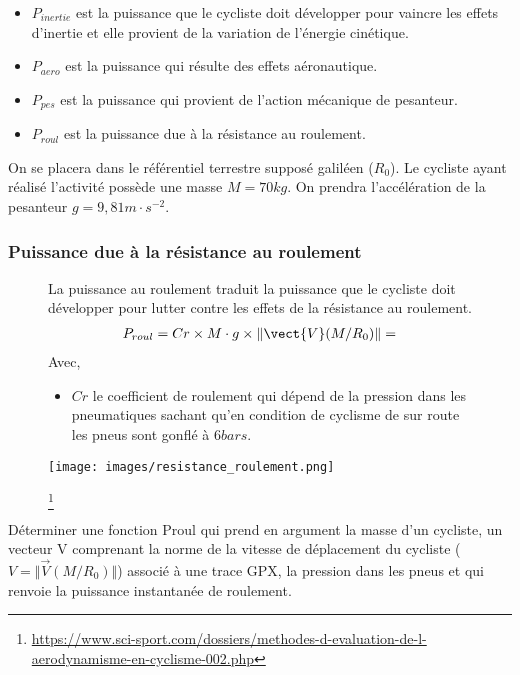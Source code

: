 \begin{itemize}
\item $P_{inertie}$ est la puissance que le cycliste doit développer pour vaincre les effets d'inertie et elle provient de la variation de l'énergie cinétique. 
\item $P_{aero}$ est la puissance qui résulte des effets aéronautique.
\item $P_{pes}$ est la puissance qui provient de l'action mécanique de pesanteur.
\item $P_{roul}$ est la puissance due à la résistance au roulement.
\end{itemize}

On se placera dans le référentiel terrestre supposé galiléen ($R_0$). Le cycliste ayant réalisé l'activité possède une masse $M=70kg$. On prendra l'accélération de la pesanteur $g=9,81m\cdot s^{-2}$.

\subsubsection{Puissance due à la résistance au roulement}

\begin{figure}[!htb]
\begin{minipage}{0.5\textwidth}
La puissance au roulement traduit la puissance que le cycliste doit développer pour lutter contre les effets de la résistance au roulement.
\begin{align*}
P_{roul}=Cr\times M\cdot g\times \Vert \vect{V}(M/R_0)\Vert=
\end{align*}
Avec,
\begin{itemize}
\item $Cr$ le coefficient de roulement qui dépend de la pression dans les pneumatiques sachant qu'en condition de cyclisme de sur route les pneus sont gonflé à $6bars$.
\end{itemize}
\end{minipage}
\begin{minipage}{0.5\textwidth}
\begin{center}
\texttt{[image: images/resistance\_roulement.png]}
\caption{\label{res_roul}}
\footnote{\url{https://www.sci-sport.com/dossiers/methodes-d-evaluation-de-l-aerodynamisme-en-cyclisme-002.php}} 
\end{center}
\end{minipage}
\end{figure}

\question{} Déterminer une fonction Proul qui prend en argument la masse d'un cycliste, un vecteur V comprenant la norme de la vitesse de déplacement du cycliste ($V=\Vert \overrightarrow{V}(M/R_0)\Vert$) associé à une trace GPX, la pression dans les pneus et qui renvoie la puissance instantanée de roulement.


